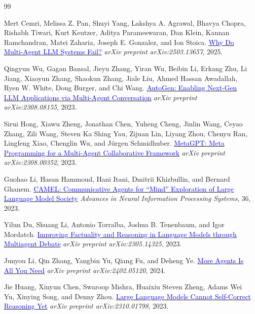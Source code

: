 \documentclass{article}
\begin{document}
\begin{thebibliography}{99}

Mert Cemri, Melissa Z. Pan, Shuyi Yang, Lakshya A. Agrawal, Bhavya Chopra,
Rishabh Tiwari, Kurt Keutzer, Aditya Parameswaran, Dan Klein,
Kannan Ramchandran, Matei Zaharia, Joseph E. Gonzalez, and Ion Stoica.
\href{https://arxiv.org/abs/2503.13657}{\textcolor{blue}{Why Do Multi-Agent {LLM} Systems Fail?}}
\textit{arXiv preprint arXiv:2503.13657}, 2025.

Qingyun Wu, Gagan Bansal, Jieyu Zhang, Yiran Wu, Beibin Li, Erkang Zhu,
Li Jiang, Xiaoyun Zhang, Shaokun Zhang, Jiale Liu, Ahmed Hassan Awadallah,
Ryen W. White, Doug Burger, and Chi Wang.
\href{https://arxiv.org/abs/2308.08155}{\textcolor{blue}{{AutoGen}: Enabling Next-Gen {LLM} Applications via Multi-Agent Conversation}}
\textit{arXiv preprint arXiv:2308.08155}, 2023.

Sirui Hong, Xiawu Zheng, Jonathan Chen, Yuheng Cheng, Jinlin Wang,
Ceyao Zhang, Zili Wang, Steven Ka Shing Yau, Zijuan Lin, Liyang Zhou,
Chenyu Ran, Lingfeng Xiao, Chenglin Wu, and J{\"u}rgen Schmidhuber.
\href{https://arxiv.org/abs/2308.00352}{\textcolor{blue}{{MetaGPT}: Meta Programming for a Multi-Agent Collaborative Framework}}
\textit{arXiv preprint arXiv:2308.00352}, 2023.

Guohao Li, Hasan Hammoud, Hani Itani, Dmitrii Khizbullin, and Bernard Ghanem.
\href{https://arxiv.org/abs/2303.17760}{\textcolor{blue}{{CAMEL}: Communicative Agents for ``Mind'' Exploration of Large Language Model Society}}
\textit{Advances in Neural Information Processing Systems}, 36, 2023.

Yilun Du, Shuang Li, Antonio Torralba, Joshua B. Tenenbaum, and Igor Mordatch.
\href{https://arxiv.org/abs/2305.14325}{\textcolor{blue}{Improving Factuality and Reasoning in Language Models through Multiagent Debate}}
\textit{arXiv preprint arXiv:2305.14325}, 2023.

Junyou Li, Qin Zhang, Yangbin Yu, Qiang Fu, and Deheng Ye.
\href{https://arxiv.org/abs/2402.05120}{\textcolor{blue}{More Agents Is All You Need}}
\textit{arXiv preprint arXiv:2402.05120}, 2024.

Jie Huang, Xinyun Chen, Swaroop Mishra, Huaixiu Steven Zheng, Adams Wei Yu,
Xinying Song, and Denny Zhou.
\href{https://arxiv.org/abs/2310.01798}{\textcolor{blue}{Large Language Models Cannot Self-Correct Reasoning Yet}}
\textit{arXiv preprint arXiv:2310.01798}, 2023.


\end{thebibliography}
\end{document}
